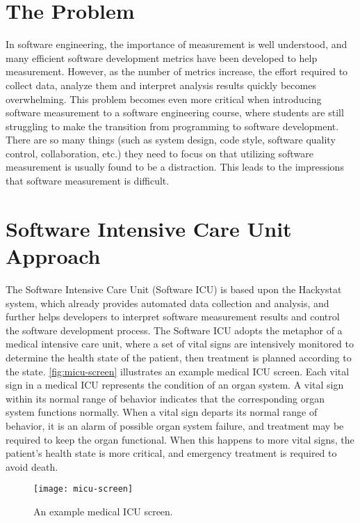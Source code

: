 \section{The Problem}
In software engineering, the importance of measurement is well understood, and many efficient software development metrics have been developed to help measurement. However, as the number of metrics increase, the effort required to collect data, analyze them and interpret analysis results quickly becomes overwhelming. This problem becomes even more critical when introducing software measurement to a software engineering course, where students are still struggling to make the transition from programming to software development. There are so many things (such as system design, code style, software quality control, collaboration, etc.) they need to focus on that utilizing software measurement is usually found to be a distraction. This leads to the impressions that software measurement is difficult. 

\section{Software Intensive Care Unit Approach}
The Software Intensive Care Unit (Software ICU) is based upon the Hackystat system, which already provides automated data collection and analysis, and further helps developers to interpret software measurement results and control the software development process. The Software ICU adopts the metaphor of a medical intensive care unit, where a set of vital signs are intensively monitored to determine the health state of the patient, then treatment is planned according to the state. \autoref{fig:micu-screen} illustrates an example medical ICU screen. Each vital sign in a medical ICU represents the condition of an organ system. A vital sign within its normal range of behavior indicates that the corresponding organ system functions normally. When a vital sign departs its normal range of behavior, it is an alarm of possible organ system failure, and treatment may be required to keep the organ functional. When this happens to more vital signs, the patient's health state is more critical, and emergency treatment is required to avoid death.

\begin{figure}[htbp]
   \centering
   \texttt{[image: micu-screen]}
   \caption{An example medical ICU screen.}
   \label{fig:micu-screen}
\end{figure}

